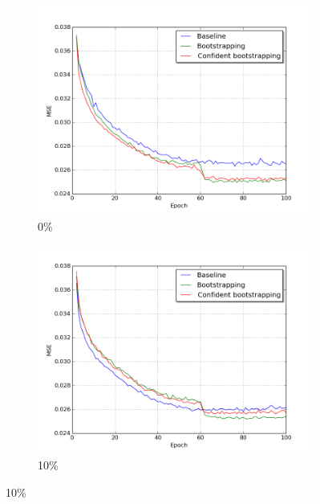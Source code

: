 \begin{figure}[H]
\begin{subfigure}{0.31\textwidth}
\includegraphics[width=\textwidth]{figs/E5/lc_0.png}
\caption{ 0\% } \label{fig:app_E5_0_lc}
\vspace{0.2cm} %
\end{subfigure}
\hspace*{\fill} %
\begin{subfigure}{0.31\textwidth}
\includegraphics[width=\textwidth]{figs/E5/lc_1.png}
\caption{10\% } \label{fig:app_E5_1_lc}
\vspace{0.2cm} %

\end{subfigure}
\end{figure}
